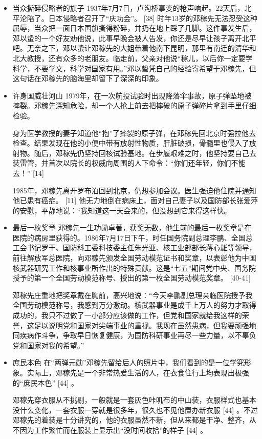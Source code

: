 \documentclass[UTF8]{ctexart}
\begin{document}
\begin{itemize}
    \item 当众撕碎侵略者的旗子
    1937年7月7日，卢沟桥事变的枪声响起。22天后，北平沦陷了。日本侵略者召开了“庆功会”。 [38]  时年13岁的邓稼先无法忍受这种屈辱，当众把一面日本国旗撕得粉碎，并扔在地上踩了几脚。这件事发生后，邓以蛰的一个好友劝他说，此事早晚会被人告发，你还是尽早让孩子离开北平吧。无奈之下，邓以蛰让邓稼先的大姐带着他南下昆明，那里有南迁的清华和北大教授，还有众多的老朋友。临走前，父亲对他说“稼儿，以后你一定要学科学，不要学文，科学对国家有用。”邓以蛰凭自己的经验寄希望于邓稼先，但这句话在邓稼先的脑海里却留下了深深的印象。
    \item 许身国威壮河山
    1979年，在一次航投试验时出现降落伞事故，原子弹坠地被摔裂。邓稼先深知危险，却一个人抢上前去把摔破的原子弹碎片拿到手里仔细检验。

身为医学教授的妻子知道他“抱”了摔裂的原子弹，在邓稼先回北京时强拉他去检查。结果发现在他的小便中带有放射性物质，肝脏破损，骨髓里也侵入了放射物。随后，邓稼先仍坚持回核试验基地。在步履艰难之时，他坚持要自己去装雷管，并首次以院长的权威向周围的人下命令：“你们还年轻，你们不能去！” [14] 

1985年，邓稼先离开罗布泊回到北京，仍想参加会议。医生强迫他住院并通知他已患有癌症。 [11] 
他无力地倒在病床上，面对自己妻子以及国防部长张爱萍的安慰，平静地说：“我知道这一天会来的，但没想到它来得这样快。
    \item 最后一枚奖章
    邓稼先一生功勋卓著，获奖无数，他生前的最后一枚奖章是在医院的病房里获得的。1986年7月17日下午，时任国务院副总理李鹏、全国总工会书记罗干、国防科工委科技委主任朱光亚、核工业部部长蒋心雄等领导，前往解放军总医院，向邓稼先颁发全国劳动模范证书和奖章，以表彰他为中国核武器研究工作和核事业所作出的特殊贡献。这是“七五”期间党中央、国务院授予的第一个全国劳动模范称号、授出的第一枚全国劳动模范奖章。 [40-41] 

    邓稼先庄重地把奖章戴在胸前，高兴地说：“今天李鹏副总理亲临医院授予我全国劳动模范称号，我感到万分激动。核武器事业是成千上万人的努力才取得成功的，我只不过做了一小部分应该做的工作，但党和国家就给我这样的荣誉，这足以说明党和国家对尖端事业的重视。我现在虽然患病，但我要顽强地同疾病作斗争，争取早日恢复健康，为国防科研事业再尽一些力量，以不辜负党和国家对我的希望。”   
    \item 庶民本色
    在“两弹元勋”邓稼先留给后人的照片中，我们看到的是一位学究形象。实际上，邓稼先是一个非常热爱生活的人，在衣食住行上均表现出极强的“庶民本色” [44]  。

邓稼先穿衣服从不挑剔，一般就是一套灰色咔叽布的中山装，衣服样式也基本没什么变化，一套衣服一穿就是很多年，很久也不见他置办新衣服 [44]  。不过邓稼先的着装是十分讲究的，他的衣服虽然不新，但从来都是干净、整齐，从不因为工作繁忙而在服装上显示出“没时间收拾”的样子 [44]  。


\end{itemize}
\end{document}
